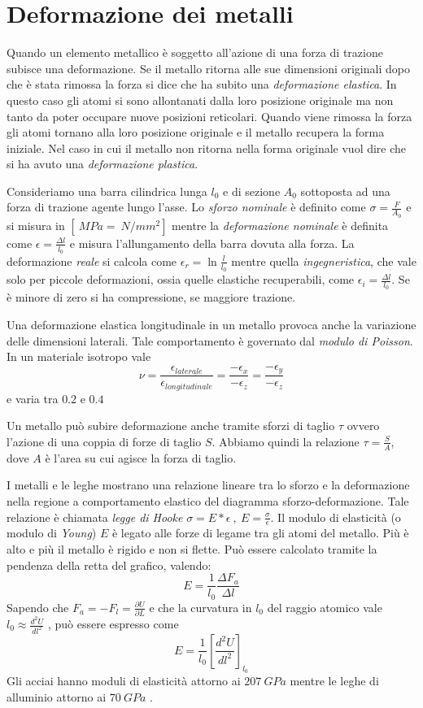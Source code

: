 \documentclass[a5paper,12pt]{article}
\begin{document}
\section{Deformazione dei metalli}
Quando un elemento metallico è soggetto all'azione di una forza di trazione subisce una deformazione. Se il metallo ritorna alle sue dimensioni originali dopo che è stata rimossa la forza si dice che ha subito una \emph{deformazione elastica}. In questo caso gli atomi si sono allontanati dalla loro posizione originale ma non tanto da poter occupare nuove posizioni  reticolari. Quando viene rimossa la forza gli atomi tornano alla loro posizione originale e il metallo recupera la forma iniziale. Nel caso in cui il metallo non ritorna nella forma originale vuol dire che si ha avuto una \emph{deformazione plastica}.

Consideriamo una barra cilindrica lunga $l_0$ e di sezione $A_0$ sottoposta ad una forza di trazione agente lungo l'asse. Lo \emph{sforzo nominale} è definito come $\sigma=\frac{F}{A_0}$  e si misura in $[\SI{}{MPa}=\SI{}{N/mm^2}]$ mentre la \emph{deformazione nominale} è definita come $\epsilon = \frac{\Delta l}{l_0}$ e misura l'allungamento della barra dovuta alla forza. La deformazione \emph{reale} si calcola come $\epsilon_r = \ln{\frac{l}{l_0}}$ 
mentre quella \emph{ingegneristica}, che vale solo per piccole deformazioni, ossia quelle elastiche recuperabili, come $\epsilon_i = \frac{\Delta l}{l_0}$. Se è minore di zero si ha compressione, se maggiore trazione.

Una deformazione elastica longitudinale in un metallo provoca anche la variazione delle dimensioni laterali. Tale comportamento è governato dal \emph{modulo di Poisson}. In un materiale isotropo vale \[\nu=\frac{\epsilon_{laterale}}{\epsilon_{longitudinale}}=\frac{-\epsilon_x}{-\epsilon_z}=\frac{-\epsilon_y}{-\epsilon_z}\] e varia tra $0.2$ e $0.4$ \label{poisson}

Un metallo può subire deformazione anche tramite sforzi di taglio $\tau$ ovvero l'azione di una coppia di forze di taglio $S$. Abbiamo quindi la relazione $\tau=\frac{S}{A}$, dove $A$ è l'area su cui agisce la forza di taglio.

I metalli e le leghe mostrano una relazione lineare tra lo sforzo e la deformazione nella regione a comportamento elastico del diagramma sforzo-deformazione. Tale relazione è chiamata \emph{legge di Hooke} $\sigma = E*\epsilon \: , \: E=\frac{\sigma}{\epsilon}$. Il modulo di elasticità (o modulo di \emph{Young}) $E$ è legato alle forze di legame tra gli atomi del metallo. Più è alto e più il metallo è rigido e non si flette. Può essere calcolato tramite la pendenza della retta del grafico, valendo: \[E=\frac{1}{l_0}\frac{\Delta F_a}{\Delta l}\] Sapendo che $F_a = -F_l=\frac{\partial U}{\partial L}$ e che la curvatura in $l_0$ del raggio atomico vale $l_0 \approx \frac{d^2U}{dl^2}$  , può essere espresso come \[E=\frac{1}{l_0} \left[ \frac{d^2U}{dl^2} \right] _{l_0}\]
Gli acciai hanno moduli di elasticità attorno ai $\SI{207}{GPa}$ mentre le leghe di alluminio attorno ai $\SI{70}{GPa}$ .
\end{document}
